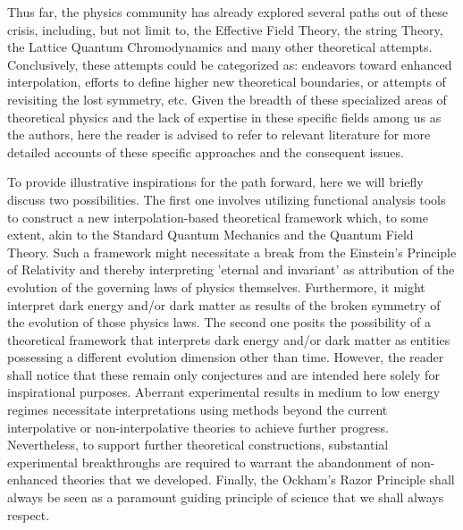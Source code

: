 \documentclass{article}
\begin{document}
Thus far, the physics community has already explored several paths out of these crisis, including, but not limit to, the Effective Field Theory, the string Theory, the Lattice Quantum Chromodynamics and many other theoretical attempts. Conclusively, these attempts could be categorized as: endeavors toward enhanced interpolation, efforts to define higher new theoretical boundaries, or attempts of revisiting the lost symmetry, etc. Given the breadth of these specialized areas of theoretical physics and the lack of expertise in these specific fields among us as the authors, here the reader is advised to refer to relevant literature for more detailed accounts of these specific approaches and the consequent issues.

To provide illustrative inspirations for the path forward, here we will briefly discuss two possibilities. The first one involves utilizing functional analysis tools to construct a new interpolation-based theoretical framework which, to some extent, akin to the Standard Quantum Mechanics and the Quantum Field Theory. Such a framework might necessitate a break from the Einstein's Principle of Relativity and thereby interpreting 'eternal and invariant' as attribution of the evolution of the governing laws of physics themselves. Furthermore, it might interpret dark energy and/or dark matter as results of the broken symmetry of the evolution of those physics laws. The second one posits the possibility of a theoretical framework that interprets dark energy and/or dark matter as entities possessing a different evolution dimension other than time. However, the reader shall notice that these remain only conjectures and are intended here solely for inspirational purposes. Aberrant experimental results in medium to low energy regimes necessitate interpretations using methods beyond the current interpolative or non-interpolative theories to achieve further progress. \cite{cmscollaboration2026} Nevertheless, to support further theoretical constructions, substantial experimental breakthroughs are required to warrant the abandonment of non-enhanced theories that we developed. Finally, the Ockham's Razor Principle shall always be seen as a paramount guiding principle of science that we shall always respect. \cite{Stromme2025} 
\end{document}
